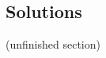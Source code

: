 \documentclass[a4paper]{article}
\begin{document}






\subsection{Solutions}

(unfinished section)
\end{document}
